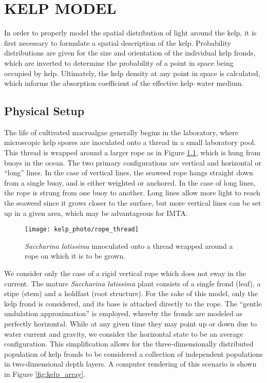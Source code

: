 \chapter{KELP MODEL}
\label{chap:kelp}

In order to properly model the spatial distribution of light around the kelp, it is first necessary to formulate a spatial description of the kelp.
Probability distributions are given for the size and orientation of the individual kelp fronds, which are inverted to determine the probability of a point in space being occupied by kelp.
Ultimately, the kelp density at any point in space is calculated, which informs the absorption coefficient of the effective kelp--water medium.


\section{Physical Setup}
The life of cultivated macroalgae generally begins in the laboratory, where microscopic kelp spores are inoculated onto a thread in a small laboratory pool.
This thread is wrapped around a larger rope as in Figure \ref{fig:rope_thread}, which is hung from buoys in the ocean.
The two primary configurations are vertical and horizontal or ``long'' lines.
In the case of vertical lines, the seaweed rope hangs straight down from a single buoy, and is either weighted or anchored.
In the case of long lines, the rope is strung from one buoy to another.
Long lines allow more light to reach the seaweed since it grows closer to the surface, but more vertical lines can be set up in a given area,
which may be advantageous for IMTA.

\begin{figure}[H]
  \centering
  \texttt{[image: kelp\_photo/rope\_thread]}
  \caption{\textit{Saccharina latissima} innoculated onto a thread wrapped around a rope on which it is to be grown.}
  \label{fig:rope_thread}
\end{figure}

We consider only the case of a rigid vertical rope which does not sway in the current.
The mature \textit{Saccharina latissima} plant consists of a single frond (leaf), a stipe (stem) and a holdfast (root structure).
For the sake of this model, only the kelp frond is considered, and its base is attached directly to the rope.
The ``gentle undulation approximation'' is employed, whereby the fronds are modeled as perfectly horizontal.
While at any given time they may point up or down due to water current and gravity, we consider the horizontal
state to be an average configuration.
This simplification allows for the three-dimensionally distributed population of kelp fronds
to be considered a collection of independent populations in two-dimensional depth layers.
A computer rendering of this scenario is shown in Figure \ref{fig:kelp_array}.

